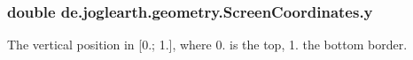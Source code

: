 \subsubsection[{y}]{\setlength{\rightskip}{0pt plus 5cm}double de.\-joglearth.\-geometry.\-Screen\-Coordinates.\-y}\label{classde_1_1joglearth_1_1geometry_1_1_screen_coordinates_a1c1164479d145ac4426dcc074219a714}
The vertical position in [0.; 1.], where 0. is the top, 1. the bottom border. 